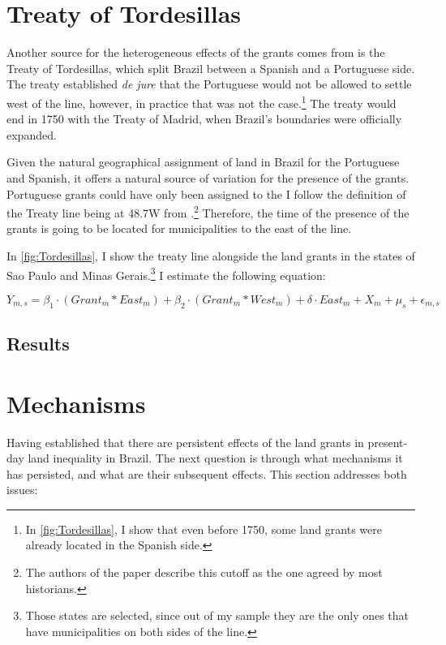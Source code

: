 \documentclass{article}
\begin{document}
\section{Treaty of Tordesillas}

Another source for the heterogeneous effects of the grants comes from is the Treaty of Tordesillas, which split Brazil between a Spanish and a Portuguese side. 
The treaty established \textit{de jure} that the Portuguese would not be allowed to settle west of the line, however, in practice that was not the case.\footnote{In \autoref{fig:Tordesillas}, I show that even before 1750, some land grants were already located in the Spanish side.}
The treaty would end in 1750 with the Treaty of Madrid, when Brazil's boundaries were officially expanded.

Given the natural geographical assignment of land in Brazil for the Portuguese and Spanish, it offers a natural source of variation for the presence of the grants.
Portuguese grants could have only been assigned to the 
I follow the definition of the Treaty line being at 48.7W from  \textcite{Laudares2022-vy}.\footnote{The authors of the paper describe this cutoff as the one agreed by most historians.}
Therefore, the time of the presence of the grants is going to be located for municipalities to the east of the line.

In \autoref{fig:Tordesillas}, I show the treaty line alongside the land grants in the states of Sao Paulo and Minas Gerais.\footnote{Those states are selected, since out of my sample they are the only ones that have municipalities on both sides of the line.}
I estimate the following equation:

\begin{equation}
  \label{eqn:tordesillas}
  Y_{m,s} = \beta_1 \cdot (Grant_m  * East_m) + \beta_2 \cdot (Grant_m * West_m) + \delta \cdot  East_m + X_{m} + \mu_s + \epsilon_{m,s}
\end{equation}

\subsection{Results}

\section{Mechanisms}

Having established that there are persistent effects of the land grants in present-day land inequality in Brazil. The next question is through what mechanisms it has persisted, and what are their subsequent effects. This section addresses both issues:
\end{document}
